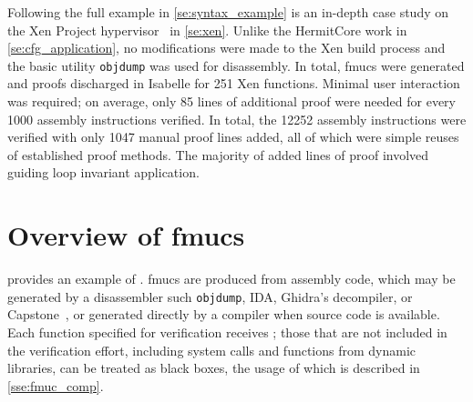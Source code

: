 Following the full example in \cref{se:syntax_example} is an in-depth case study
on the Xen Project hypervisor~\citep{chisnall2008definitive} in \cref{se:xen}.%
Unlike the HermitCore work in \cref{se:cfg_application},%
no modifications were made to the Xen build process
and the basic utility \texttt{objdump} was used for disassembly.
In total, \acp{fmuc} were generated and proofs discharged in Isabelle
for 251 Xen functions.
Minimal user interaction was required;
on average, only \num{85} lines of additional proof were needed
for every \num{1000} assembly instructions verified.
In total, the \num{12252} assembly instructions
were verified with only \num{1047} manual proof lines added,
all of which were simple reuses of established proof methods.
The majority of added lines of proof involved guiding loop invariant application.%

\section{Overview of \acsp*{fmuc}}\label{se:fmuc_ex}
 provides an example of .
\Acp{fmuc} are produced from assembly code,
which may be generated by a disassembler such \texttt{objdump},
IDA,
Ghidra's decompiler, or Capstone~\citep{capstone},
or generated directly by a compiler when source code is available.
Each function specified for verification receives ;
those that are not included in the verification effort,
including system calls and functions from dynamic libraries,
can be treated as black boxes,
the usage of which is described in \cref{sse:fmuc_comp}.

